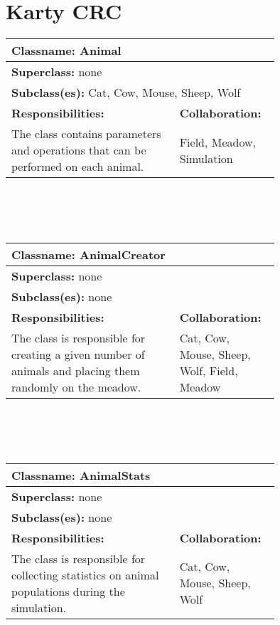 \documentclass{article}
\begin{document}
\section{Karty CRC}
\begin{tabular}{|p{0.55\linewidth}|p{0.2\linewidth}|}
\hline
\multicolumn{2}{|l|}{\textbf{Classname:} Animal} \\
\hline
\multicolumn{2}{|l|}{\textbf{Superclass:} none} \\
\multicolumn{2}{|l|}{\textbf{Subclass(es):} Cat, Cow, Mouse, Sheep, Wolf} \\
\hline
\textbf{Responsibilities:}  &  \textbf{Collaboration:} \\
The class contains parameters and operations that can be performed on each animal. & Field, Meadow, Simulation \\
\hline
\end{tabular}
\\ \\ \\
\begin{tabular}{|p{0.55\linewidth}|p{0.2\linewidth}|}
\hline
\multicolumn{2}{|l|}{\textbf{Classname:} AnimalCreator} \\
\hline
\multicolumn{2}{|l|}{\textbf{Superclass:} none} \\
\multicolumn{2}{|l|}{\textbf{Subclass(es):} none} \\
\hline
\textbf{Responsibilities:}  &  \textbf{Collaboration:} \\
The class is responsible for creating a given number of animals and placing them randomly on the meadow. & Cat, Cow, Mouse, Sheep, Wolf, Field, Meadow \\
\hline
\end{tabular}
\\ \\ \\
\begin{tabular}{|p{0.55\linewidth}|p{0.2\linewidth}|}
\hline
\multicolumn{2}{|l|}{\textbf{Classname:} AnimalStats} \\
\hline
\multicolumn{2}{|l|}{\textbf{Superclass:} none} \\
\multicolumn{2}{|l|}{\textbf{Subclass(es):} none} \\
\hline
\textbf{Responsibilities:}  &  \textbf{Collaboration:} \\
The class is responsible for collecting statistics on animal populations during the simulation. & Cat, Cow, Mouse, Sheep, Wolf \\
\hline
\end{tabular}
\end{document}

